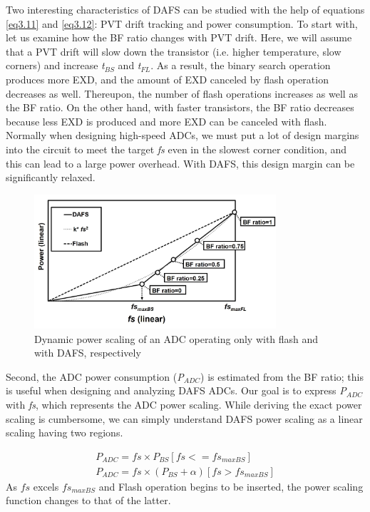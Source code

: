 Two interesting characteristics of DAFS can be studied with the help of equations \eqref{eq3.11} and \eqref{eq3.12}: PVT drift tracking and power consumption. To start with, let us examine how the BF ratio changes with PVT drift. Here, we will assume that a PVT drift will slow down the transistor (i.e. higher temperature, slow corners) and increase \textit{t${}_{BS}$} and \textit{t${}_{FL}$}. As a result, the binary search operation produces more EXD, and the amount of EXD canceled by flash operation decreases as well. Thereupon, the number of flash operations increases as well as the BF ratio. On the other hand, with faster transistors, the BF ratio decreases because less EXD is produced and more EXD can be canceled with flash.  Normally when designing high-speed ADCs, we must put a lot of design margins into the circuit to meet the target \textit{fs} even in the slowest corner condition, and this can lead to a large power overhead. With DAFS, this design margin can be significantly relaxed. 

\begin{figure}
\centering
  \includegraphics[width=0.8\textwidth]{figure/chap3/fig6.jpg}
  \caption{Dynamic power scaling of an ADC operating only with flash and with DAFS, respectively}
  \label{fig-3-6}
\end{figure}

Second, the ADC power consumption (\textit{P${}_{ADC}$}) is estimated from the BF ratio; this is useful when designing and analyzing DAFS ADCs. Our goal is to express \textit{P${}_{ADC\ }$}with \textit{fs}, which represents the ADC power scaling. While deriving the exact power scaling is cumbersome, we can simply understand DAFS power scaling as a linear scaling having two regions.

\begin{align*} 
 P_{ADC}=fs\times {P_{BS}}[fs <= {fs}_{maxBS}] \\
 P_{ADC}=fs\times \left(P_{BS}+\alpha \right) [fs>{fs}_{maxBS}]
 \label{eq3.16}
\end{align*}
As $fs$ excels $fs_{maxBS}$ and Flash operation begins to be inserted, the power scaling function changes to that of the latter.

